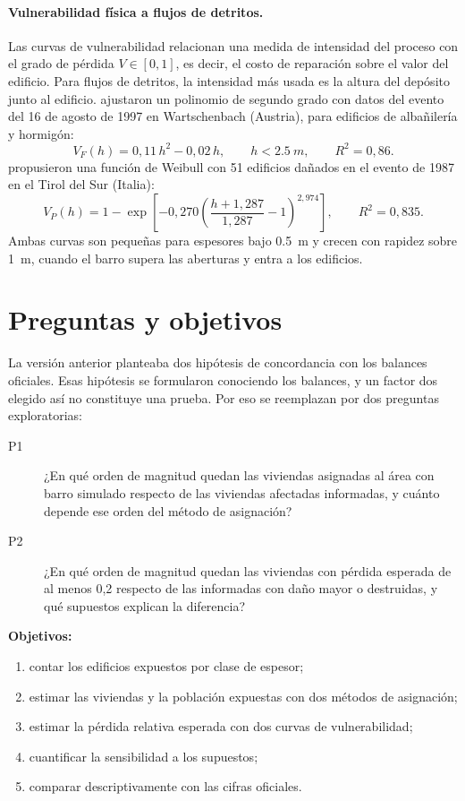 \documentclass[10pt,a4paper]{article}
\begin{document}
\paragraph{Vulnerabilidad física a flujos de detritos.} Las curvas de vulnerabilidad relacionan una medida de intensidad del proceso con el grado de pérdida $V\in[0,1]$, es decir, el costo de reparación sobre el valor del edificio. Para flujos de detritos, la intensidad más usada es la altura del depósito junto al edificio. \citet{fuchs2007} ajustaron un polinomio de segundo grado con datos del evento del 16 de agosto de 1997 en Wartschenbach (Austria), para edificios de albañilería y hormigón:
\begin{equation}
V_F(h)=0{,}11\,h^2-0{,}02\,h,\qquad h<\SI{2,5}{m},\qquad R^2=0{,}86. \label{eq:fuchs}
\end{equation}
\citet{papathoma2012} propusieron una función de Weibull con 51 edificios dañados en el evento de 1987 en el Tirol del Sur (Italia):
\begin{equation}
V_P(h)=1-\exp\!\left[-0{,}270\left(\frac{h+1{,}287}{1{,}287}-1\right)^{2{,}974}\right],\qquad R^2=0{,}835. \label{eq:pk}
\end{equation}
Ambas curvas son pequeñas para espesores bajo \SI{0,5}{m} y crecen con rapidez sobre \SI{1}{m}, cuando el barro supera las aberturas y entra a los edificios.

\section{Preguntas y objetivos}
La versión anterior planteaba dos hipótesis de concordancia con los balances oficiales. Esas hipótesis se formularon conociendo los balances, y un factor dos elegido así no constituye una prueba. Por eso se reemplazan por dos preguntas exploratorias:
\begin{description}
\item[P1] ¿En qué orden de magnitud quedan las viviendas asignadas al área con barro simulado respecto de las viviendas afectadas informadas, y cuánto depende ese orden del método de asignación?
\item[P2] ¿En qué orden de magnitud quedan las viviendas con pérdida esperada de al menos 0,2 respecto de las informadas con daño mayor o destruidas, y qué supuestos explican la diferencia?
\end{description}
\noindent\textbf{Objetivos:}
\begin{enumerate}
\item contar los edificios expuestos por clase de espesor;
\item estimar las viviendas y la población expuestas con dos métodos de asignación;
\item estimar la pérdida relativa esperada con dos curvas de vulnerabilidad;
\item cuantificar la sensibilidad a los supuestos;
\item comparar descriptivamente con las cifras oficiales.
\end{enumerate}
\end{document}
